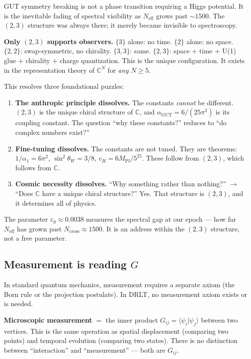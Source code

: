 \documentclass[12pt]{article}
\theoremstyle{remark}
\theoremstyle{definition}
\begin{document}
GUT symmetry breaking is not a phase transition requiring a Higgs potential. It is the inevitable fading of spectral visibility as $N_\text{eff}$ grows past $\sim 1500$. The $(2,3)$ structure was always there; it merely became invisible to spectroscopy.

\textbf{Only $(2,3)$ supports observers.} $\{3\}$ alone: no time. $\{2\}$ alone: no space. $\{2,2\}$: swap-symmetric, no chirality. $\{3,3\}$: same. $\{2,3\}$: space $+$ time $+$ U(1) glue $+$ chirality $+$ charge quantization. This is the unique configuration. It exists in the representation theory of $\mathbb{C}^N$ for \emph{any} $N \geq 5$.

This resolves three foundational puzzles:

\begin{enumerate}
\item \textbf{The anthropic principle dissolves.} The constants \emph{cannot} be different. $(2,3)$ is the unique chiral structure of $\mathbb{C}$, and $\alpha_\text{GUT} = 6/(25\pi^2)$ is its coupling constant. The question ``why these constants?'' reduces to ``do complex numbers exist?''

\item \textbf{Fine-tuning dissolves.} The constants are not tuned. They are theorems: $1/\alpha_1 = 6\pi^2$, $\sin^2\theta_W = 3/8$, $v_H = 6M_\text{Pl}/5^{25}$. These follow from $(2,3)$, which follows from $\mathbb{C}$.

\item \textbf{Cosmic necessity dissolves.} ``Why something rather than nothing?'' $\to$ ``Does $\mathbb{C}$ have a unique chiral structure?'' Yes. That structure is $(2,3)$, and it determines all of physics.
\end{enumerate}

The parameter $\varepsilon_0 \approx 0.0038$ measures the spectral gap at our epoch --- how far $N_\text{eff}$ has grown past $N_\text{cross} \approx 1500$. It is an address within the $(2,3)$ structure, not a free parameter.

\subsection{Measurement is reading $G$}

In standard quantum mechanics, measurement requires a separate axiom (the Born rule or the projection postulate). In DRLT, no measurement axiom exists or is needed.

\textbf{Microscopic measurement} $=$ the inner product $G_{ij} = \langle\psi_i|\psi_j\rangle$ between two vertices. This is the same operation as spatial displacement (comparing two points) and temporal evolution (comparing two states). There is no distinction between ``interaction'' and ``measurement'' --- both are $G_{ij}$.
\end{document}
